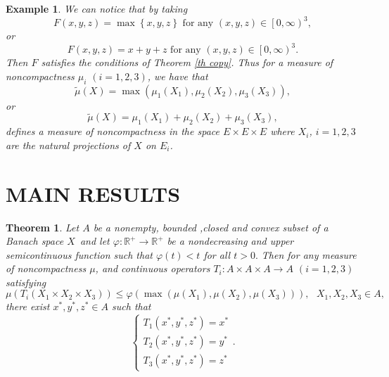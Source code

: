 \documentclass{amsart}
\newtheorem{theorem}{Theorem}
\theoremstyle{plain}
\newtheorem{example}{Example}
\numberwithin{equation}{section}
\begin{document}
\begin{example}
\cite{nour}We can notice that by taking 
\begin{equation*}
F\left( x,y,z\right) =\max \left\{ x,y,z\right\} \text{ for any }\left(
x,y,z\right) \in \left[ 0,\infty \right) ^{3},
\end{equation*}or\begin{equation*}
F\left( x,y,z\right) =x+y+z\text{ for any }\left( x,y,z\right) \in \left[
0,\infty \right) ^{3}.
\end{equation*}Then $F$ satisfies the conditions of Theorem \ref{th copy}. Thus for a
measure of noncompactness $\mu _{i}$ $\left( i=1,2,3\right) $, we have that 
\begin{equation*}
\widetilde{\mu }\left( X\right) =\max \left( \mu _{1}\left( X_{1}\right)
,\mu _{2}\left( X_{2}\right) ,\mu _{3}\left( X_{3}\right) \right) ,
\end{equation*}or 
\begin{equation*}
\widetilde{\mu }\left( X\right) =\mu _{1}\left( X_{1}\right) +\mu _{2}\left(
X_{2}\right) +\mu _{3}\left( X_{3}\right) ,
\end{equation*}defines a measure of noncompactness in the space $E\times E\times E$ where $X_{i}$, $i=1,2,3$ are the natural projections of $X$ on $E_{i}$.
\end{example}

\section{MAIN RESULTS}

\begin{theorem}
Let $A$ be a nonempty, bounded ,closed and convex subset of a Banach space $X $\ and let $\varphi :\mathbb{R}^{+}\rightarrow \mathbb{R}^{+}$ be a
nondecreasing and upper semicontinuous function such that $\varphi \left(
t\right) <t$ for all $t>0.$ Then for any measure of noncompactness $\mu $,
and continuous operators $T_{i}:A\times A\times A\rightarrow A$ $\left(
i=1,2,3\right) $ satisfying\begin{equation}
\mu \left( T_{i}\left( X_{1}\times X_{2}\times X_{3}\right) \right)
\leqslant \varphi \left( \max \left( \mu \left( X_{1}\right) ,\mu \left(
X_{2}\right) ,\mu \left( X_{3}\right) \right) \right) ,\text{ }X_{1},X_{2},X_{3}\in A,  \label{cndt}
\end{equation}there exist $x^{\ast },y^{\ast },z^{\ast }\in A$ such that\begin{equation*}
\left\{ 
\begin{array}{c}
T_{1}\left( x^{\ast },y^{\ast },z^{\ast }\right) =x^{\ast } \\ 
T_{2}\left( x^{\ast },y^{\ast },z^{\ast }\right) =y^{\ast } \\ 
T_{3}\left( x^{\ast },y^{\ast },z^{\ast }\right) =z^{\ast }\end{array}\right. .
\end{equation*}
\end{theorem}
\end{document}
